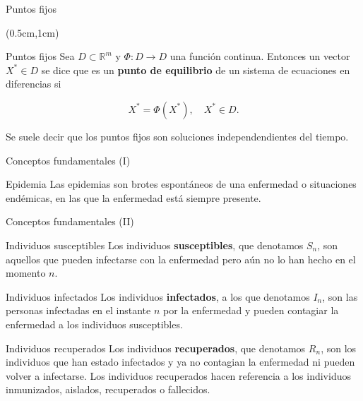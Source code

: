\begin{frame}{Puntos fijos}

    \begin{textblock*}{12cm}(0.5cm,1cm)
        \begin{block}{Puntos fijos}
            Sea $D\subset \mathbb{R}^m$ y $\Phi :D\rightarrow D$ una función continua. Entonces un vector $X^* \in D$ se dice que es un \textbf{punto de equilibrio} de un sistema de ecuaciones en diferencias si

            $$X^* = \Phi (X^*),\quad X^* \in D.$$

        \end{block}  
        
        Se suele decir que los puntos fijos son soluciones independendientes del tiempo.
    \end{textblock*}



\end{frame}


\begin{frame}{Conceptos fundamentales (I)}

    \begin{block}{Epidemia}
        Las epidemias son brotes espontáneos de una enfermedad o situaciones endémicas, en las que la enfermedad está siempre presente.
    \end{block}  

\end{frame}



\begin{frame}{Conceptos fundamentales (II)}

    \begin{block}{Individuos susceptibles}
        Los individuos \textbf{susceptibles}, que denotamos $S_n$, son aquellos que pueden infectarse con la enfermedad pero aún no lo han hecho en el momento $n$.
    \end{block}  

    \pause

    \begin{block}{Individuos infectados}
        Los individuos \textbf{infectados}, a los que denotamos $I_n$, son las personas infectadas en el instante $n$ por la enfermedad y pueden contagiar la enfermedad a los individuos susceptibles.
    \end{block}  

    \pause

    \begin{block}{Individuos recuperados}
        Los individuos \textbf{recuperados}, que denotamos $R_n$, son los individuos que han estado infectados y ya no contagian la enfermedad ni pueden volver a infectarse.
        Los individuos recuperados hacen referencia a los individuos inmunizados, aislados, recuperados o fallecidos.
    \end{block}  


\end{frame}


